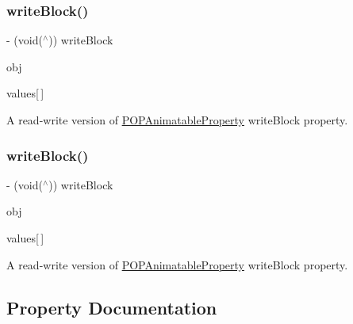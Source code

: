 \subsubsection{\texorpdfstring{write\+Block()}{writeBlock()}\hspace{0.1cm}{\footnotesize\ttfamily [1/2]}}
{\footnotesize\ttfamily -\/ (void($^\wedge$)) write\+Block \begin{DoxyParamCaption}\item[{(id)}]{obj }\item[{(const C\+G\+Float)}]{values\mbox{[}$\,$\mbox{]} }\end{DoxyParamCaption}}

A read-\/write version of \mbox{\hyperlink{interface_p_o_p_animatable_property}{P\+O\+P\+Animatable\+Property}} write\+Block property. \mbox{\label{interface_p_o_p_mutable_animatable_property_af66c1a8f0245be80b2dfa790d5b84a75}} 
\subsubsection{\texorpdfstring{write\+Block()}{writeBlock()}\hspace{0.1cm}{\footnotesize\ttfamily [2/2]}}
{\footnotesize\ttfamily -\/ (void($^\wedge$)) write\+Block \begin{DoxyParamCaption}\item[{(id)}]{obj }\item[{(const C\+G\+Float)}]{values\mbox{[}$\,$\mbox{]} }\end{DoxyParamCaption}}

A read-\/write version of \mbox{\hyperlink{interface_p_o_p_animatable_property}{P\+O\+P\+Animatable\+Property}} write\+Block property. 

\subsection{Property Documentation}
\mbox{\label{interface_p_o_p_mutable_animatable_property_aacf5e3b67c7f6327a61e60e716dd88ff}} 
